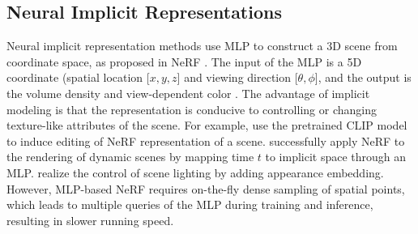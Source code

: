 \documentclass[letterpaper]{article} \usepackage{aaai23}  \usepackage{times}  \usepackage{helvet}  \usepackage{courier}  \usepackage[hyphens]{url}  \usepackage{graphicx} \urlstyle{rm} \def\UrlFont{\rm}  \usepackage{natbib}  \usepackage{caption} \frenchspacing  \setlength{\pdfpagewidth}{8.5in}  \setlength{\pdfpageheight}{11in}  \usepackage{multirow}
\begin{document}
\subsection{Neural Implicit Representations} 
Neural implicit representation methods use MLP to construct a 3D scene from coordinate space, as proposed in NeRF \cite{mildenhall2020NeRF}. The input of the MLP is a 5D coordinate (spatial location [$x, y, z$] and viewing direction [$\theta, \phi$], and the output is the volume density and view-dependent color \cite{mildenhall2019llff, sitzmann2019svn, lombardi2019nv, bi2020deep}. The advantage of implicit modeling is that the representation is conducive to controlling or changing texture-like attributes of the scene. For example, \citeauthor{kobayashi2022decomposingEditing} use the pretrained CLIP model \cite{radford2021clip} to induce editing of NeRF representation of a scene. \citeauthor{pumarola2021dNeRF} successfully apply NeRF to the rendering of dynamic scenes by mapping time $t$ to implicit space through an MLP. \citeauthor{martin2021NeRFinthewild} realize the control of scene lighting by adding appearance embedding. However, MLP-based NeRF requires on-the-fly dense sampling of spatial points, which leads to multiple queries of the MLP during training and inference, resulting in slower running speed.
\end{document}
